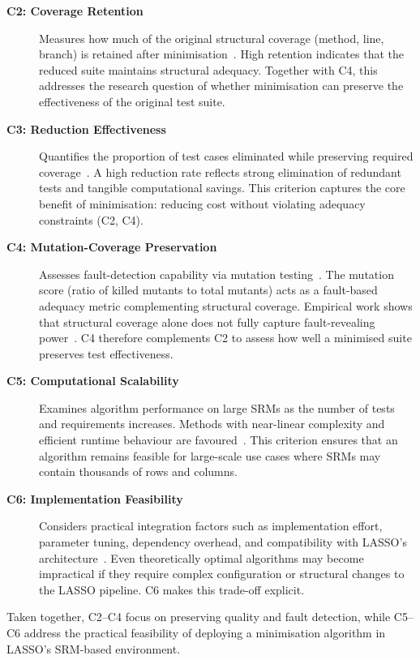 \begin{description}
  \item[\textbf{C2: Coverage Retention}] 
  Measures how much of the original structural coverage (method, line, branch) is retained after minimisation~\cite{zhu1997}. 
  High retention indicates that the reduced suite maintains structural adequacy.
  Together with C4, this addresses the research question of whether minimisation can preserve the effectiveness of the original test suite.

  \item[\textbf{C3: Reduction Effectiveness}] 
  Quantifies the proportion of test cases eliminated while preserving required coverage~\cite{yoo2012}. 
  A high reduction rate reflects strong elimination of redundant tests and tangible computational savings.
  This criterion captures the core benefit of minimisation: reducing cost without violating adequacy constraints (C2, C4).

  \item[\textbf{C4: Mutation-Coverage Preservation}] 
  Assesses fault-detection capability via mutation testing~\cite{jehan2023,noemmer2020}. 
  The mutation score (ratio of killed mutants to total mutants) acts as a fault-based adequacy metric complementing structural coverage.
  Empirical work shows that structural coverage alone does not fully capture fault-revealing power~\cite{jehan2023}. C4 therefore complements C2 to assess how well a minimised suite preserves test effectiveness.

  \item[\textbf{C5: Computational Scalability}] 
  Examines algorithm performance on large SRMs as the number of tests and requirements increases. 
  Methods with near-linear complexity and efficient runtime behaviour are favoured~\cite{Kessel2022,bach2017}.
  This criterion ensures that an algorithm remains feasible for large-scale use cases where SRMs may contain thousands of rows and columns.

  \item[\textbf{C6: Implementation Feasibility}] 
  Considers practical integration factors such as implementation effort, parameter tuning, dependency overhead, and compatibility with LASSO’s architecture~\cite{yoo2012}. 
  Even theoretically optimal algorithms may become impractical if they require complex configuration or structural changes to the LASSO pipeline. C6 makes this trade-off explicit.
\end{description}

Taken together, C2--C4 focus on preserving quality and fault detection, while C5--C6 address the practical feasibility of deploying a minimisation algorithm in LASSO’s SRM-based environment.

